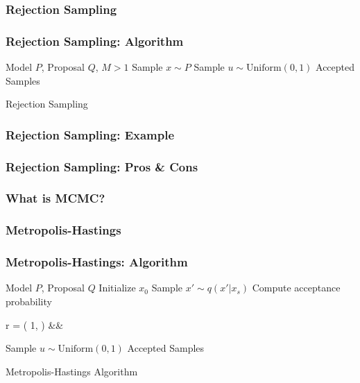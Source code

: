 \documentclass{beamer}
\begin{document}


\begin{frame}
\frametitle{Rejection Sampling}
\end{frame}


\begin{frame}
\frametitle{Rejection Sampling: Algorithm}
\begin{algorithm}[H]
\begin{algorithmic}[1]
  \REQUIRE Model $P$, Proposal $Q$, $M > 1$
  \STATE Sample $x \sim P$
  \STATE Sample $u \sim \text{Uniform}(0, 1)$
  \ELSE
  \ENDIF
  \ENSURE Accepted Samples
\end{algorithmic}
\caption{Rejection Sampling}
\end{algorithm}
\end{frame}


\begin{frame}
\frametitle{Rejection Sampling: Example}
\end{frame}


\begin{frame}
\frametitle{Rejection Sampling: Pros \& Cons}
\end{frame}




\begin{frame}
\frametitle{What is MCMC?}
\end{frame}


\begin{frame}
\frametitle{Metropolis-Hastings}
\end{frame}


\begin{frame}
\frametitle{Metropolis-Hastings: Algorithm}
  \begin{algorithm}[H]
  \scriptsize
  \begin{algorithmic}[1]
    \REQUIRE Model $P$, Proposal $Q$
    \STATE Initialize $x_0$
      \STATE Sample $x' \sim q(x'|x_s)$
      \STATE Compute acceptance probability
        \begin{flalign*}
          r = \min\left( 1, \;   \right) &&
        \end{flalign*}
      \STATE Sample $u \sim \text{Uniform}(0, 1)$
      \ELSE
      \ENDIF
    \ENDFOR
    \ENSURE Accepted Samples
  \end{algorithmic}
  \caption{Metropolis-Hastings Algorithm}
  \end{algorithm}
\end{frame}
\end{document}
